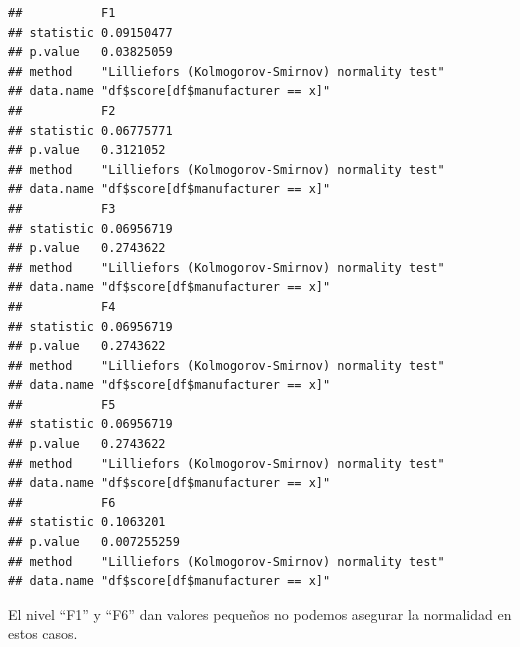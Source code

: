\documentclass[
]{article}
\newenvironment{Shaded}{\begin{snugshade}}{\end{snugshade}}
\newcommand{\CommentTok}[1]{\textcolor[rgb]{0.56,0.35,0.01}{\textit{#1}}}
\begin{document}
\begin{verbatim}
##           F1                                              
## statistic 0.09150477                                      
## p.value   0.03825059                                      
## method    "Lilliefors (Kolmogorov-Smirnov) normality test"
## data.name "df$score[df$manufacturer == x]"                
##           F2                                              
## statistic 0.06775771                                      
## p.value   0.3121052                                       
## method    "Lilliefors (Kolmogorov-Smirnov) normality test"
## data.name "df$score[df$manufacturer == x]"                
##           F3                                              
## statistic 0.06956719                                      
## p.value   0.2743622                                       
## method    "Lilliefors (Kolmogorov-Smirnov) normality test"
## data.name "df$score[df$manufacturer == x]"                
##           F4                                              
## statistic 0.06956719                                      
## p.value   0.2743622                                       
## method    "Lilliefors (Kolmogorov-Smirnov) normality test"
## data.name "df$score[df$manufacturer == x]"                
##           F5                                              
## statistic 0.06956719                                      
## p.value   0.2743622                                       
## method    "Lilliefors (Kolmogorov-Smirnov) normality test"
## data.name "df$score[df$manufacturer == x]"                
##           F6                                              
## statistic 0.1063201                                       
## p.value   0.007255259                                     
## method    "Lilliefors (Kolmogorov-Smirnov) normality test"
## data.name "df$score[df$manufacturer == x]"
\end{verbatim}

\begin{Shaded}
\end{Shaded}

El nivel ``F1'' y ``F6'' dan valores pequeños no podemos asegurar la
normalidad en estos casos.
\end{document}
